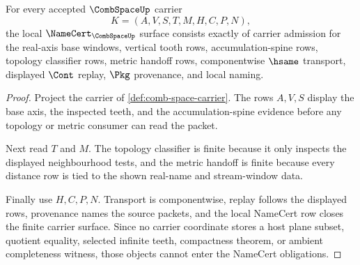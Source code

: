 \begin{theorem}
\label{thm:comb-space-namecert-obligations}
For every accepted $\CombSpaceUp$ carrier
$$
K=(A,V,S,T,M,H,C,P,N),
$$
the local $\NameCert_{\CombSpaceUp}$ surface consists exactly of carrier admission for the real-axis base windows, vertical tooth rows, accumulation-spine rows, topology classifier rows, metric handoff rows, componentwise $\hsame$ transport, displayed $\Cont$ replay, $\Pkg$ provenance, and local naming.
\end{theorem}
\begin{proof}
Project the carrier of \autoref{def:comb-space-carrier}. The rows $A,V,S$ display the base axis, the inspected teeth, and the accumulation-spine evidence before any topology or metric consumer can read the packet.

Next read $T$ and $M$. The topology classifier is finite because it only inspects the displayed neighbourhood tests, and the metric handoff is finite because every distance row is tied to the shown real-name and stream-window data.

Finally use $H,C,P,N$. Transport is componentwise, replay follows the displayed rows, provenance names the source packets, and the local NameCert row closes the finite carrier surface. Since no carrier coordinate stores a host plane subset, quotient equality, selected infinite teeth, compactness theorem, or ambient completeness witness, those objects cannot enter the NameCert obligations.
\end{proof}

